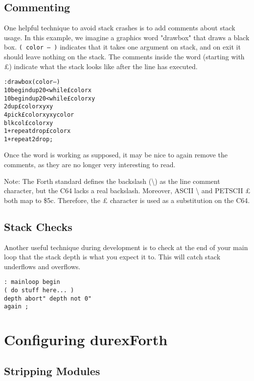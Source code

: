 \subsection{Commenting}

One helpful technique to avoid stack crashes is to add comments about stack usage.
In this example, we imagine a graphics word "drawbox" that draws a black box.
\texttt{( color -- )} indicates that it takes one argument on stack, and on exit it should
leave nothing on the stack. The comments inside the word (starting with \pounds) indicate what the stack
looks like after the line has executed.

\begin{alltt}
: drawbox ( color -- )
10 begin dup 20 < while \pounds color x
10 begin dup 20 < while \pounds color x y
2dup \pounds color x y x y
4 pick \pounds color x y x y color
blkcol \pounds color x y
1+ repeat drop \pounds color x
1+ repeat 2drop ;
\end{alltt}

Once the word is working as supposed, it may be nice to again remove the comments, as
they are no longer very interesting to read.
\par{}\medskip{}
Note: The Forth standard defines the backslash (\textbackslash) as the line comment character, but the C64 lacks a real backslash. Moreover, ASCII \textbackslash{} and PETSCII \pounds{} both map to \${}5c. Therefore, the \pounds{} character is used as a substitution on the C64.

\subsection{Stack Checks}

Another useful technique during development is to check at the end of your main loop
that the stack depth is what you expect it to. This will catch stack underflows
and overflows.

\begin{verbatim}
: mainloop begin
( do stuff here... )
depth abort" depth not 0"
again ;
\end{verbatim}

\section{Configuring durexForth}

\subsection{Stripping Modules}

